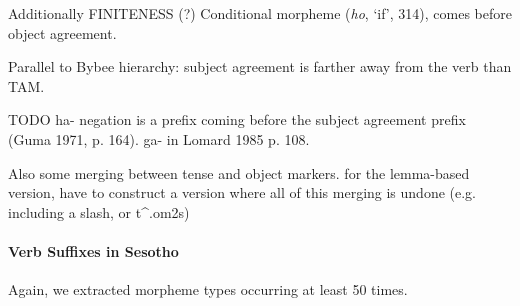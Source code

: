 Additionally FINITENESS (?) Conditional morpheme (\emph{ho}, `if', 314), comes before object agreement.

Parallel to Bybee hierarchy: subject agreement is farther away from the verb than TAM.


TODO ha- negation is a prefix coming before the subject agreement prefix (Guma 1971, p. 164).  ga- in Lomard 1985 p. 108.



Also some merging between tense and object markers. for the lemma-based version, have to construct a version where all of this merging is undone (e.g. including a slash, or t\^{}.om2s)


\paragraph{Verb Suffixes in Sesotho}

Again, we extracted morpheme types occurring at least 50 times.

